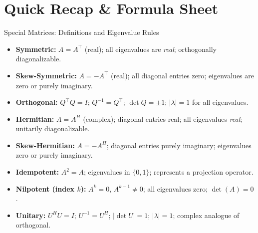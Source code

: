 \documentclass[12pt,a4paper]{article}
\begin{document}
\section{Quick Recap \& Formula Sheet}

\begin{learnbox}{Special Matrices: Definitions and Eigenvalue Rules}
\begin{itemize}
  \item \textbf{Symmetric:} $A = A^\top$ (real); all eigenvalues are \emph{real}; orthogonally diagonalizable.
  \item \textbf{Skew-Symmetric:} $A = -A^\top$ (real); all diagonal entries zero; eigenvalues are zero or purely imaginary.
  \item \textbf{Orthogonal:} $Q^\top Q = I$; $Q^{-1} = Q^\top$; $\det Q = \pm1$; $|\lambda| = 1$ for all eigenvalues.
  \item \textbf{Hermitian:} $A = A^H$ (complex); diagonal entries real; all eigenvalues \emph{real}; unitarily diagonalizable.
  \item \textbf{Skew-Hermitian:} $A = -A^H$; diagonal entries purely imaginary; eigenvalues zero or purely imaginary.
  \item \textbf{Idempotent:} $A^2 = A$; eigenvalues in $\{0, 1\}$; represents a projection operator.
  \item \textbf{Nilpotent (index $k$):} $A^k = 0$, $A^{k-1}\neq 0$; all eigenvalues zero; $\det(A) = 0$.
  \item \textbf{Unitary:} $U^H U = I$; $U^{-1} = U^H$; $|\det U| = 1$; $|\lambda| = 1$; complex analogue of orthogonal.
\end{itemize}
\end{learnbox}
\end{document}
